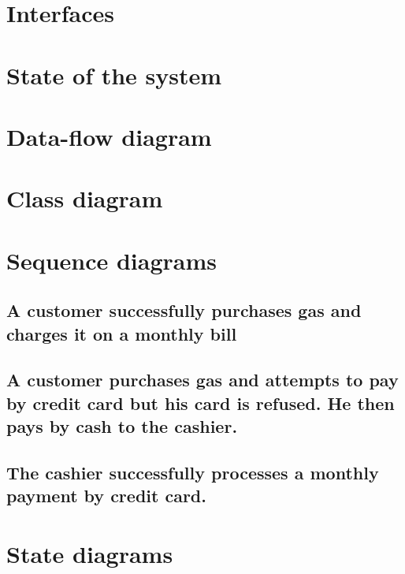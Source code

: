 \documentclass[11pt, a4paper]{article}
\begin{document}
    \section{Interfaces}
    \section{State of the system}
    \section{Data-flow diagram}
    \section{Class diagram}
    \section{Sequence diagrams}
        \subsection{A customer successfully purchases gas and charges it on
        a monthly bill}
        \subsection{A customer purchases gas and attempts to pay by credit
        card but his card is refused. He then pays by cash to the cashier.}
        \subsection{The cashier successfully processes a monthly payment by
        credit card.}
    \section{State diagrams}
\end{document}
